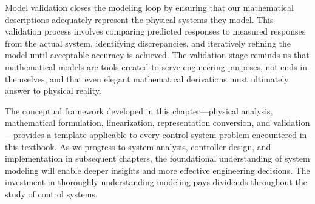 Model validation closes the modeling loop by ensuring that our mathematical descriptions adequately represent the physical systems they model. This validation process involves comparing predicted responses to measured responses from the actual system, identifying discrepancies, and iteratively refining the model until acceptable accuracy is achieved. The validation stage reminds us that mathematical models are tools created to serve engineering purposes, not ends in themselves, and that even elegant mathematical derivations must ultimately answer to physical reality.

The conceptual framework developed in this chapter---physical analysis, mathematical formulation, linearization, representation conversion, and validation---provides a template applicable to every control system problem encountered in this textbook. As we progress to system analysis, controller design, and implementation in subsequent chapters, the foundational understanding of system modeling will enable deeper insights and more effective engineering decisions. The investment in thoroughly understanding modeling pays dividends throughout the study of control systems.